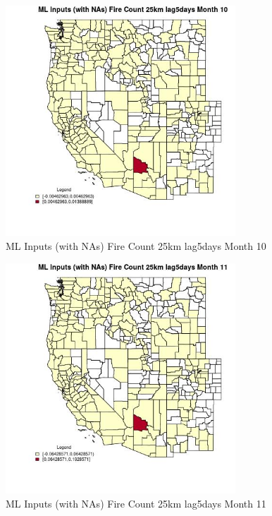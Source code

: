 \begin{figure} 
\centering  
\includegraphics[width=0.77\textwidth]{Code_Outputs/Report_ML_input_PM25_Step4_part_e_de_duplicated_aves_compiled_2019-05-21wNAs_CountyFire_Count_25km_lag5daysmedianMonth10.jpg} 
\caption{\label{fig:Report_ML_input_PM25_Step4_part_e_de_duplicated_aves_compiled_2019-05-21wNAsCountyFire_Count_25km_lag5daysmedianMonth10}ML Inputs (with NAs) Fire Count 25km lag5days Month 10} 
\end{figure} 
 

\clearpage 

\begin{figure} 
\centering  
\includegraphics[width=0.77\textwidth]{Code_Outputs/Report_ML_input_PM25_Step4_part_e_de_duplicated_aves_compiled_2019-05-21wNAs_CountyFire_Count_25km_lag5daysmedianMonth11.jpg} 
\caption{\label{fig:Report_ML_input_PM25_Step4_part_e_de_duplicated_aves_compiled_2019-05-21wNAsCountyFire_Count_25km_lag5daysmedianMonth11}ML Inputs (with NAs) Fire Count 25km lag5days Month 11} 
\end{figure} 
 

